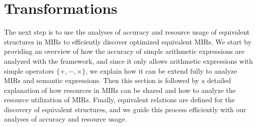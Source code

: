 \section{Transformations}
\label{po:sec:transformations}

The next step is to use the analyses of accuracy and resource usage of
equivalent structures in MIRs to efficiently discover optimized equivalent
MIRs.  We start by providing an overview of how the accuracy of simple
arithmetic expressions are analyzed with the \soap{} framework, and since it
only allows arithmetic expressions with simple operators $\{+, -, \times\}$, we
explain how it can be extend fully to analyze MIRs and semantic expressions.
Then this section is followed by a detailed explanation of how resources
in MIRs can be shared and how to analyze the resource utilization of MIRs.
Finally, equivalent relations are defined for the discovery of equivalent
structures, and we guide this process efficiently with our analyses of accuracy
and resource usage.




